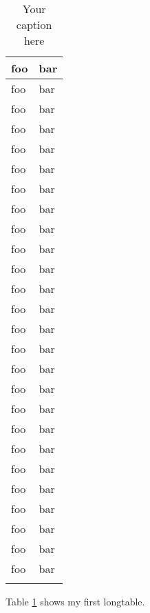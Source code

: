 \begin{longtable}{| p{} | p{} |}
	foo & bar \\ \hline
	foo & bar \\ \hline
	foo & bar \\ \hline
	foo & bar \\ \hline
	foo & bar \\ \hline
	foo & bar \\ \hline
		foo & bar \\ \hline
	foo & bar \\ \hline
	foo & bar \\ \hline
	foo & bar \\ \hline
	foo & bar \\ \hline
	foo & bar \\ \hline
	foo & bar \\ \hline
		foo & bar \\ \hline
	foo & bar \\ \hline
	foo & bar \\ \hline
	foo & bar \\ \hline
	foo & bar \\ \hline
	foo & bar \\ \hline
	foo & bar \\ \hline
		foo & bar \\ \hline
	foo & bar \\ \hline
	foo & bar \\ \hline
	foo & bar \\ \hline
	foo & bar \\ \hline
	foo & bar \\ \hline

	\caption{Your caption here} %
	\label{tab:myfirstlongtable}
\end{longtable}

Table \ref{tab:myfirstlongtable} shows my first longtable.

\lipsum[1]